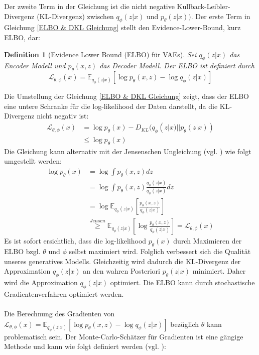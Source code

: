 \documentclass[%
thesis=student,%
coverpage=false,%
titlepage=false,%
headmarks=true, %
german,%
font=libertine, %
math=newpxtx, %
BCOR=5mm,%
coverBCOR=11mm%
]{tumbook}
\theoremstyle{break}
\newtheorem{definition}{Definition}[section]
\begin{document}
Der zweite Term in der Gleichung ist die nicht negative Kullback-Leibler-Divergenz (KL-Divergenz) zwischen $q_\phi(z|x)$ und $p_\theta(z|x))$. Der erste Term in Gleichung \ref{ELBO & DKL Gleichung} stellt den Evidence-Lower-Bound, kurz ELBO, dar: 
\begin{definition}[Evidence Lower Bound (ELBO) für VAEs]
	Sei $q_\phi(z|x)$ das Encoder Modell und $p_\theta(x,z)$ das Decoder Modell. Der ELBO ist definiert durch
	$$ \mathcal{L}_{\theta,\phi}(x) = \mathbb{E}_{q_\phi(z|x)}[\log p_\theta(x,z) - \log q_\phi(z|x)] $$ 
\end{definition}\noindent
Die Umstellung der Gleichung \ref{ELBO & DKL Gleichung} zeigt, dass der ELBO eine untere Schranke für die log-likelihood der Daten darstellt, da die KL-Divergenz nicht negativ ist: 
\begin{align}
	\mathcal{L}_{\theta,\phi}(x) &= \log p_\theta(x) - D_{KL}(q_\phi(z|x)||p_\theta(z|x)) \\
	&\leq 	\log p_\theta(x) 
\end{align}\noindent
Die Gleichung kann alternativ mit der Jensenschen Ungleichung (vgl. \cite{JensenscheUngleichung}) wie folgt umgestellt werden:
\begin{align}
	\log p_\theta(x) &= \log \int p_\theta(x,z) dz \\
	&= \log \int p_\theta(x,z) \frac{q_\phi(z|x)}{q_\phi(z|x)} dz \\
	& = \log \mathbb{E}_{q_\phi(z|x)}\left[\frac{p_\theta(x,z)}{q_\phi(z|x)}\right] \\
	& \overset{Jensen}{\geq} \mathbb{E}_{q_\phi(z|x)}\left[\log \frac{p_\theta(x,z)}{q_\phi(z|x)}\right] = \mathcal{L}_{\theta,\phi}(x)
\end{align}\noindent
Es ist sofort ersichtlich, dass die log-likelihood $p_\theta(x)$ durch Maximieren der ELBO bzgl. $\theta$ und  $\phi$ selbst maximiert wird.
Folglich verbessert sich die Qualität unseres generatives Modells. Gleichzeitig wird  dadurch die KL-Divergenz der Approximation $q_\phi(z|x)$ an den wahren Posteriori $p_\theta(z|x)$ minimiert. Daher wird die Approximation $q_\phi(z|x)$ optimiert. 
Die ELBO kann durch stochastische Gradientenverfahren optimiert werden.\\
\\
Die Berechnung des Gradienten von $\mathcal{L}_{\theta,\phi}(x) = \mathbb{E}_{q_\phi(z|x)}\left[\log p_\theta(x,z)- \log q_\phi(z|x)\right]$ bezüglich $\theta$ kann problematisch sein. Der Monte-Carlo-Schätzer für Gradienten ist eine gängige Methode und kann wie folgt definiert werden (vgl. \cite{MonteCarloEstimation}): 
\end{document}
